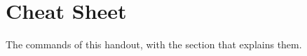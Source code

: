 \chapter{Cheat Sheet}\label{app:cheat-sheet}

The commands of this handout, with the section that explains them.

\newcommand{\cheat}[1]{\par\medskip{\bfseries #1\par}\nopagebreak\smallskip}
\newenvironment{cheattable}{%
    \par\noindent
    \renewcommand{\arraystretch}{1.1}%
    \begin{tabular}{@{}p{.62\linewidth}@{\hspace{.5em}}>{\raggedright\arraybackslash}p{.34\linewidth}@{}}
}{%
    \end{tabular}\par
}

